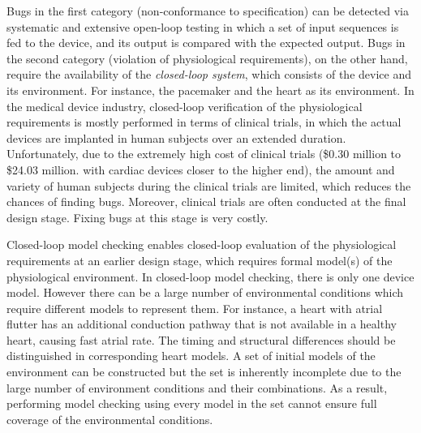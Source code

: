 Bugs in the first category (non-conformance to specification) can be detected via systematic and extensive open-loop testing in which a set of input sequences is fed to the device, and its output is compared with the expected output.
Bugs in the second category (violation of physiological requirements), on the other hand, require the availability of the \emph{closed-loop system}, which consists of the device and its environment.
For instance, the pacemaker and the heart as its environment. 
In the medical device industry, closed-loop verification of the physiological requirements is mostly performed in terms of clinical trials, in which the actual devices are implanted in human subjects over an extended duration.
Unfortunately, due to the extremely high cost of clinical trials (\$0.30
million to \$24.03 million.\cite{trial_cost} with cardiac devices closer to the higher end), the amount and variety of human subjects during the clinical trials are limited, which reduces the chances of finding bugs. 
Moreover, clinical trials are often conducted at the final design stage. Fixing bugs at this stage is very costly.

Closed-loop model checking enables closed-loop evaluation of the physiological requirements at an earlier design stage, which requires formal model(s) of the physiological environment. 
In closed-loop model checking, there is only one device model. 
However there can be a large number of environmental conditions which require different models to represent them. For instance, a heart with atrial flutter has an additional conduction pathway that is not available in a healthy heart, causing fast atrial rate. The timing and structural differences should be distinguished in corresponding heart models.
A set of initial models of the environment can be constructed but the set is inherently incomplete due to the large number of environment conditions and their combinations. 
As a result, performing model checking using every model in the set cannot ensure full coverage of the environmental conditions. 

